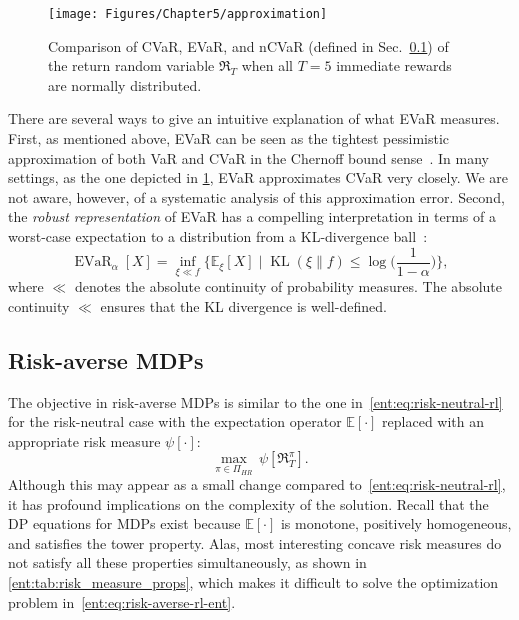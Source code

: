 \documentclass[twoside]{article}
\newcommand{\E}{\mathbb{E}}
\DeclareMathOperator{\kl}{KL}
\newcommand{\evar}[2]{\operatorname{EVaR}_{#1} \left[#2\right]}
\newcommand{\risk}[1]{\psi \left[#1\right]}
\theoremstyle{plain}
\theoremstyle{definition}
\theoremstyle{remark}
\renewcommand{\cite}[1]{\citep{#1}}
\begin{document}
\begin{figure}[!t]
  \centering
  \texttt{[image: Figures/Chapter5/approximation]}
\vspace{-0.1in}
  \caption{Comparison of CVaR, EVaR, and nCVaR (defined in Sec.~\ref{ent:sec:risk-MDP}) of the return random variable $\mathfrak{R}_T$ when all $T=5$ immediate rewards are normally distributed.}
  \label{ent:fig:nested-approximation}
\end{figure}

There are several ways to give an intuitive explanation of what EVaR measures. First, as mentioned above, EVaR can be seen as the tightest pessimistic approximation of both VaR and CVaR in the Chernoff bound sense~\cite{Ahmadi-Javid2012}. In many settings, as the one depicted in \cref{ent:fig:nested-approximation}, EVaR approximates CVaR very closely. We are not aware, however, of a systematic analysis of this approximation error. Second, the {\em robust representation} of EVaR has a compelling interpretation in terms of a worst-case expectation to a distribution from a KL-divergence ball~\cite{Ahmadi-Javid2012}:
%
\begin{equation*} 
\label{ent:eq:defn_evar-dual}
\evar{\alpha}{X} = \inf_{\xi \ll f} \Big\{\E_{\xi } [X] \mid  \kl(\xi \| f) \le \log \big( \frac{1}{1-\alpha} \big) \Big\},
\end{equation*}
%
where $\ll$ denotes the absolute continuity of probability measures. The absolute continuity $\ll$ ensures that the KL divergence is well-defined. 



\subsection{Risk-averse MDPs}
\label{ent:sec:risk-MDP}

The objective in risk-averse MDPs is similar to the one in~\eqref{ent:eq:risk-neutral-rl} for the risk-neutral case with the expectation operator $\E[\cdot]$ replaced with an appropriate risk measure $\psi[\cdot]$:
%
\begin{equation} \label{ent:eq:risk-averse-rl-ent}
  \max_{\pi\in \Pi_{HR}} \, \risk{\mathfrak{R}_{T}^\pi}. 
\end{equation}
%
Although this may appear as a small change compared to~\eqref{ent:eq:risk-neutral-rl}, it has profound implications on the complexity of the solution. Recall that the DP equations for MDPs exist because $\E[\cdot]$ is monotone, positively homogeneous, and satisfies the tower property. Alas, most interesting concave risk measures do not satisfy all these properties simultaneously, as shown in \cref{ent:tab:risk_measure_props}, which makes it difficult to solve the optimization problem in~\eqref{ent:eq:risk-averse-rl-ent}.
\end{document}
